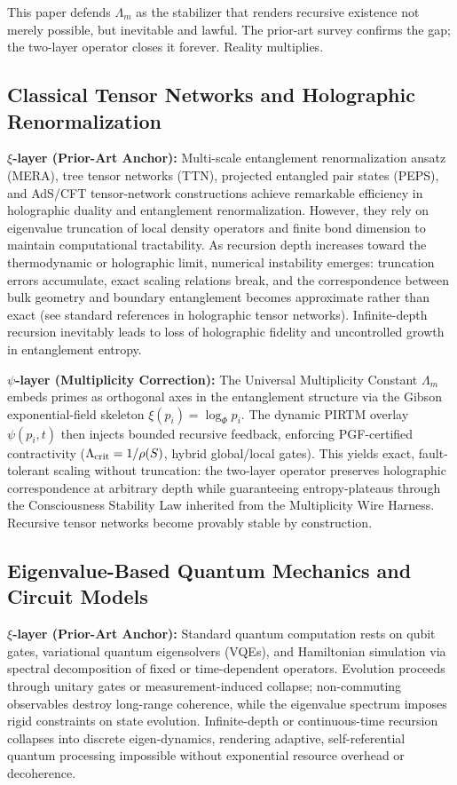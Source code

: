 \documentclass[11pt, a4paper]{article}
\begin{document}
This paper defends \(\Lambda_m\) as the stabilizer that renders recursive existence not merely possible, but inevitable and lawful. The prior-art survey confirms the gap; the two-layer operator closes it forever. Reality multiplies.

\subsection{Classical Tensor Networks and Holographic Renormalization}

\textbf{\(\xi\)-layer (Prior-Art Anchor):}  
Multi-scale entanglement renormalization ansatz (MERA), tree tensor networks (TTN), projected entangled pair states (PEPS), and AdS/CFT tensor-network constructions achieve remarkable efficiency in holographic duality and entanglement renormalization. However, they rely on eigenvalue truncation of local density operators and finite bond dimension to maintain computational tractability. As recursion depth increases toward the thermodynamic or holographic limit, numerical instability emerges: truncation errors accumulate, exact scaling relations break, and the correspondence between bulk geometry and boundary entanglement becomes approximate rather than exact (see standard references in holographic tensor networks). Infinite-depth recursion inevitably leads to loss of holographic fidelity and uncontrolled growth in entanglement entropy.

\textbf{\(\psi\)-layer (Multiplicity Correction):}  
The Universal Multiplicity Constant \(\Lambda_m\) embeds primes as orthogonal axes in the entanglement structure via the Gibson exponential-field skeleton \(\xi(p_i) = \log_\Phi p_i\). The dynamic PIRTM overlay \(\psi(p_i,t)\) then injects bounded recursive feedback, enforcing PGF-certified contractivity (\(\Lambda_{\rm crit} = 1/\rho(S)\), hybrid global/local gates). This yields exact, fault-tolerant scaling without truncation: the two-layer operator preserves holographic correspondence at arbitrary depth while guaranteeing entropy-plateaus through the Consciousness Stability Law inherited from the Multiplicity Wire Harness. Recursive tensor networks become provably stable by construction.

\subsection{Eigenvalue-Based Quantum Mechanics and Circuit Models}

\textbf{\(\xi\)-layer (Prior-Art Anchor):}  
Standard quantum computation rests on qubit gates, variational quantum eigensolvers (VQEs), and Hamiltonian simulation via spectral decomposition of fixed or time-dependent operators. Evolution proceeds through unitary gates or measurement-induced collapse; non-commuting observables destroy long-range coherence, while the eigenvalue spectrum imposes rigid constraints on state evolution. Infinite-depth or continuous-time recursion collapses into discrete eigen-dynamics, rendering adaptive, self-referential quantum processing impossible without exponential resource overhead or decoherence.
\end{document}
